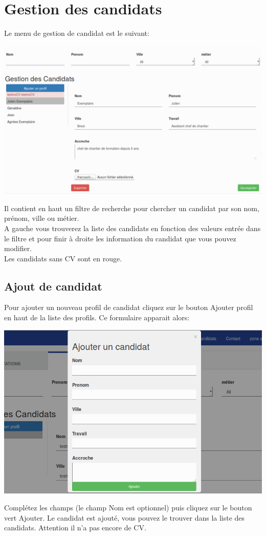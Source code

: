 \documentclass[a4paper, 12pt]{report}
\begin{document}
\section{Gestion des candidats}
Le menu de gestion de candidat est le suivant:
\begin{center}
\includegraphics[width=16cm]{candidatsAdmin.png}
\end{center}
Il contient en haut un filtre de recherche pour chercher un candidat par son nom, prénom, ville ou métier.\\
A gauche vous trouverez la liste des candidats en fonction des valeurs entrée dans le filtre et pour finir à droite les information du candidat que vous pouvez modifier.\\
Les candidats sans CV sont en rouge.

\subsection{Ajout de candidat}
Pour ajouter un nouveau profil de candidat cliquez sur le bouton Ajouter profil en haut de la liste des profils. Ce formulaire apparait alors:
\begin{center}
\includegraphics[width=16cm]{candidatsAdd.png}
\end{center}
Complétez les champs (le champ Nom est optionnel) puis cliquez sur le bouton vert Ajouter.
Le candidat est ajouté, vous pouvez le trouver dans la liste des candidats. Attention il n'a pas encore de CV.
\end{document}
